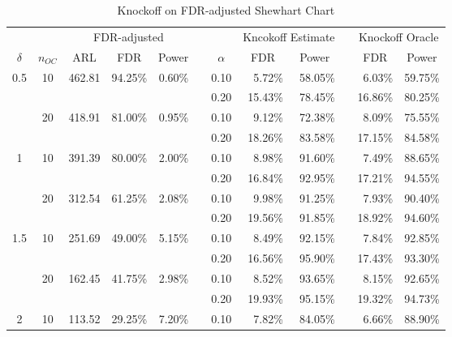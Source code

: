 \documentclass[a4paper,12pt]{article}
\begin{document}
\begin{table}[htbp]
  \centering
  \caption{Knockoff on FDR-adjusted Shewhart Chart}
    \begin{tabular}{ccrrrrrrrrrr}
\midrule     &   & \multicolumn{3}{c}{FDR-adjusted } &   &   & \multicolumn{2}{c}{Kncokoff Estimate} &   & \multicolumn{2}{c}{Knockoff Oracle} \\
\cmidrule{3-5}\cmidrule{7-9}\cmidrule{11-12}    \multicolumn{1}{c}{$\delta$} & \multicolumn{1}{c}{$n_{OC}$} & \multicolumn{1}{c}{ARL} & \multicolumn{1}{c}{FDR} & \multicolumn{1}{c}{Power} &   & \multicolumn{1}{c}{$\alpha$} & \multicolumn{1}{c}{FDR} & \multicolumn{1}{c}{Power} &   & \multicolumn{1}{c}{FDR} & \multicolumn{1}{c}{Power} \\
    \midrule
    0.5 & 10 &         462.81  & 94.25\% & 0.60\% &   &             0.10  & 5.72\% & 58.05\% &   & 6.03\% & 59.75\% \\
      &   &   &   &   &   &             0.20  & 15.43\% & 78.45\% &   & 16.86\% & 80.25\% \\
      & 20 &         418.91  & 81.00\% & 0.95\% &   &             0.10  & 9.12\% & 72.38\% &   & 8.09\% & 75.55\% \\
      &   &   &   &   &   &             0.20  & 18.26\% & 83.58\% &   & 17.15\% & 84.58\% \\
    1 & 10 &         391.39  & 80.00\% & 2.00\% &   &             0.10  & 8.98\% & 91.60\% &   & 7.49\% & 88.65\% \\
      &   &   &   &   &   &             0.20  & 16.84\% & 92.95\% &   & 17.21\% & 94.55\% \\
      & 20 &         312.54  & 61.25\% & 2.08\% &   &             0.10  & 9.98\% & 91.25\% &   & 7.93\% & 90.40\% \\
      &   &   &   &   &   &             0.20  & 19.56\% & 91.85\% &   & 18.92\% & 94.60\% \\
    1.5 & 10 &         251.69  & 49.00\% & 5.15\% &   &             0.10  & 8.49\% & 92.15\% &   & 7.84\% & 92.85\% \\
      &   &   &   &   &   &             0.20  & 16.56\% & 95.90\% &   & 17.43\% & 93.30\% \\
      & 20 &         162.45  & 41.75\% & 2.98\% &   &             0.10  & 8.52\% & 93.65\% &   & 8.15\% & 92.65\% \\
      &   &   &   &   &   &             0.20  & 19.93\% & 95.15\% &   & 19.32\% & 94.73\% \\
    2 & 10 &         113.52  & 29.25\% & 7.20\% &   &             0.10  & 7.82\% & 84.05\% &   & 6.66\% & 88.90\% \\

\end{tabular}
\end{table}
\end{document}
